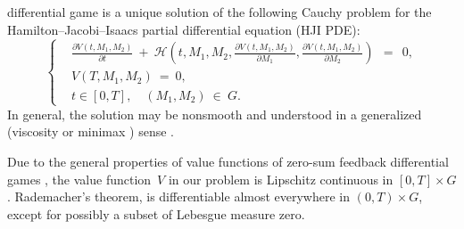 \documentclass[11pt]{amsart}
\begin{document}
differential game is a unique solution of the following Cauchy problem for the
Hamilton--Jacobi--Isaacs partial differential equation (HJI PDE):
\begin{equation}
\left\{ \begin{aligned}
& \frac{\partial V(t, M_1, M_2)}{\partial t} \: + \: \mathcal{H}
  \left( t, M_1, M_2, \frac{\partial V(t, M_1, M_2)}{\partial M_1},
  \frac{\partial V(t, M_1, M_2)}{\partial M_2} \right) \:\: = \:\: 0, \\
& V(T, M_1, M_2) \: = \: 0, \\
& t \in [0, T], \quad (M_1, M_2) \: \in \: G.
\end{aligned} \right.  \label{15}
\end{equation}
In general, the solution may be 
nonsmooth %
and understood in a generalized
(viscosity %
or 
minimax %
) sense \cite{FlemingSoner2006,Subbotin1995}.

Due to the general properties of value functions of zero-sum feedback
differential games \cite{BotkinHoffmannTurova2011}, the value function~$ V $
in our problem is 
Lipschitz continuous %
in $ [0, T] \times G $. 
Rademacher's theorem, %
is differentiable almost everywhere in $ (0, T) \times G $, except
for possibly a 
subset of Lebesgue measure zero. %
\end{document}
